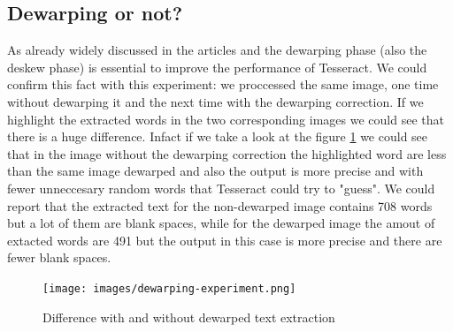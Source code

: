 \documentclass[10pt,twocolumn,letterpaper]{article}
\begin{document}
\subsection{Dewarping or not?}
As already widely discussed in the articles \cite{Improvingcamera-based} and \cite{recoveringhomography} the dewarping phase (also the deskew phase) is essential to improve the performance of Tesseract. We could confirm this fact with this experiment: we proccessed the same image, one time without dewarping it and the next time with the dewarping correction. If we highlight the extracted words in the two corresponding images we could see that there is a huge difference. Infact if we take a look at the figure \ref{dewarping-experiment} we could see that in the image without the dewarping correction the highlighted word are less than the same image dewarped and also the output is more precise and with fewer unneccesary random words that Tesseract could try to "guess". We could report that the extracted text for the non-dewarped image contains 708 words but a lot of them are blank spaces, while for the dewarped image the amout of extacted words are 491 but the output in this case is more precise and there are fewer blank spaces.

\begin{figure}[b]
	\centering
	\texttt{[image: images/dewarping-experiment.png]}
	\caption{Difference with and without dewarped text extraction}
	\label{dewarping-experiment}
\end{figure}
\end{document}
